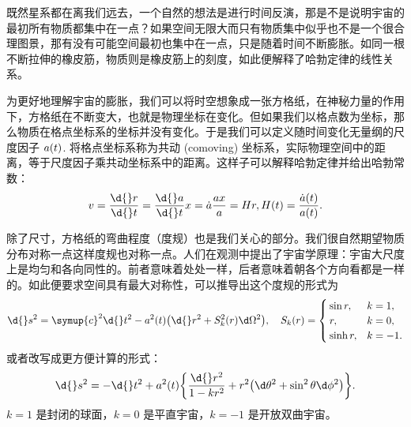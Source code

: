 \documentclass[../天体物理基础.tex]{subfiles}
\begin{document}
既然星系都在离我们远去，一个自然的想法是进行时间反演，那是不是说明宇宙的最初所有物质都集中在一点？如果空间无限大而只有物质集中似乎也不是一个很合理图景，那有没有可能空间最初也集中在一点，只是随着时间不断膨胀。如同一根不断拉伸的橡皮筋，物质则是橡皮筋上的刻度，如此便解释了哈勃定律的线性关系。

为更好地理解宇宙的膨胀，我们可以将时空想象成一张方格纸，在神秘力量的作用下，方格纸在不断变大，也就是物理坐标在变化。但如果我们以格点数为坐标，那么物质在格点坐标系的坐标并没有变化。于是我们可以定义随时间变化无量纲的尺度因子 $a\mleft(t\mright)$. 将格点坐标系称为共动 (comoving) 坐标系，实际物理空间中的距离，等于尺度因子乘共动坐标系中的距离。这样子可以解释哈勃定律并给出哈勃常数：
\begin{align}
v=\frac{\d{}r}{\d{}t}=\frac{\d{}a}{\d{}t}x=\dot{a}\frac{ax}{a}=Hr, H\mleft(t\mright)=\frac{\dot a\mleft(t\mright)}{a\mleft(t\mright)}.
\end{align}

除了尺寸，方格纸的弯曲程度（度规）也是我们关心的部分。我们很自然期望物质分布对称一点这样度规也对称一点。人们在观测中提出了宇宙学原理：宇宙大尺度上是均匀和各向同性的。前者意味着处处一样，后者意味着朝各个方向看都是一样的。如此便要求空间具有最大对称性，可以推导出这个度规的形式为
\begin{equation}
\d{}s^{2}=\symup{c}^{2}\d{}t^{2}-a^{2}\mleft(t\mright)\mleft(\d{}r^{2}+S_{k}^{2}\mleft(r\mright)\d\Omega^{2}\mright),\quad S_{k}\mleft(r\mright)=
\begin{cases}
\sin{r},&k=1,\\
r,&k=0,\\
\sinh{r},&k=-1.
\end{cases}
\end{equation}
或者改写成更方便计算的形式：
\begin{equation}
\d{}s^{2}=-\d{}t^{2}+a^{2}\mleft(t\mright)\mleft\{\frac{\d{}r^{2}}{1-kr^{2}}+r^{2}\mleft(\d\theta^{2}+\sin^{2}{\theta}\d\phi^{2}\mright)\mright\}.\label{1.6.4}
\end{equation}
$k=1$ 是封闭的球面，$k=0$ 是平直宇宙，$k=-1$ 是开放双曲宇宙。
\end{document}
